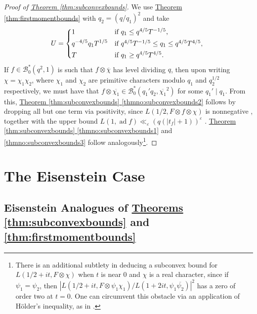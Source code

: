\documentclass[11pt,a4paper]{amsart}
\newcommand{\BB}{\mathcal{B}}
\newcommand{\e}{\varepsilon}
\DeclareMathOperator{\ad}{ad}
\numberwithin{equation}{section}
\theoremstyle{remark}
\theoremstyle{definition}
\begin{document}
\begin{proof}[Proof of {\hyperref[thm:subconvexbounds]{Theorem \ref*{thm:subconvexbounds}}}]
We use \hyperref[thm:firstmomentbounds]{Theorem \ref*{thm:firstmomentbounds}} with $q_2 = (q/q_1)^2$ and take
\[U = \begin{dcases*}
1 & if $q_1 \leq q^{4/5} T^{-1/5}$,	\\
q^{-4/5} q_1 T^{1/5} & if $q^{4/5} T^{-1/5} \leq q_1 \leq q^{4/5} T^{4/5}$,	\\
T & if $q_1 \geq q^{4/5} T^{4/5}$.
\end{dcases*}\]
If $f \in \BB_0^{\ast}(q^2,1)$ is such that $f \otimes \overline{\chi}$ has level dividing $q$, then upon writing $\chi = \chi_1 \chi_2$, where $\chi_1$ and $\chi_2$ are primitive characters modulo $q_1$ and $q_2^{1/2}$ respectively, we must have that $f \otimes \overline{\chi_1} \in \BB_0^{\ast}(q_1' q_2,\overline{\chi_1}^2)$ for some $q_1' \mid q_1$. From this, \hyperref[thmno:subconvexbounds2]{Theorem \ref*{thm:subconvexbounds} \ref*{thmno:subconvexbounds2}} follows by dropping all but one term via positivity, since $L(1/2,F \otimes f \otimes \chi)$ is nonnegative \cite[Theorem 1.1]{Lap03}, together with the upper bound $L(1,\ad f) \ll_{\e} (q(|t_f| + 1))^{\e}$ \cite[Corollary 1]{Li10}. \hyperref[thmno:subconvexbounds1]{Theorem \ref*{thm:subconvexbounds} \ref*{thmno:subconvexbounds1}} and \ref{thmno:subconvexbounds3} follow analogously\footnote{There is an additional subtlety in deducing a subconvex bound for $L(1/2 + it,F \otimes \chi)$ when $t$ is near $0$ and $\chi$ is a real character, since if $\psi_1 = \psi_2$, then $|L(1/2 + it, F \otimes \psi_1 \chi_1)/L(1 + 2it,\psi_1 \overline{\psi_2})|^2$ has a zero of order two at $t = 0$. One can circumvent this obstacle via an application of H\"{o}lder's inequality, as in \cite[pp.~1404--1405]{Blo12}.}.
\end{proof}


\section{The Eisenstein Case}
\label{sect:Eisenstein}


\subsection{Eisenstein Analogues of \texorpdfstring{\hyperref[thm:subconvexbounds]{Theorems \ref*{thm:subconvexbounds}}}{Theorems \ref{thm:subconvexbounds}} and \ref{thm:firstmomentbounds}}
\end{document}

